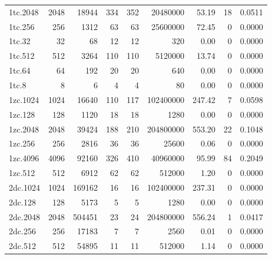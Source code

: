 {\begin{longtable}{lrrrrrrrr}
1tc.2048 & 2048 & 18944 & 334 & 352 & 20480000 & 53.19 & 18 & 0.0511 \\
1tc.256 & 256 & 1312 & 63 & 63 & 25600000 & 72.45 & 0 & 0.0000 \\
1tc.32 & 32 & 68 & 12 & 12 & 320 & 0.00 & 0 & 0.0000 \\
1tc.512 & 512 & 3264 & 110 & 110 & 5120000 & 13.74 & 0 & 0.0000 \\
1tc.64 & 64 & 192 & 20 & 20 & 640 & 0.00 & 0 & 0.0000 \\
1tc.8 & 8 & 6 & 4 & 4 & 80 & 0.00 & 0 & 0.0000 \\
1zc.1024 & 1024 & 16640 & 110 & 117 & 102400000 & 247.42 & 7 & 0.0598 \\
1zc.128 & 128 & 1120 & 18 & 18 & 1280 & 0.00 & 0 & 0.0000 \\
1zc.2048 & 2048 & 39424 & 188 & 210 & 204800000 & 553.20 & 22 & 0.1048 \\
1zc.256 & 256 & 2816 & 36 & 36 & 25600 & 0.06 & 0 & 0.0000 \\
1zc.4096 & 4096 & 92160 & 326 & 410 & 40960000 & 95.99 & 84 & 0.2049 \\
1zc.512 & 512 & 6912 & 62 & 62 & 512000 & 1.20 & 0 & 0.0000 \\
2dc.1024 & 1024 & 169162 & 16 & 16 & 102400000 & 237.31 & 0 & 0.0000 \\
2dc.128 & 128 & 5173 & 5 & 5 & 1280 & 0.00 & 0 & 0.0000 \\
2dc.2048 & 2048 & 504451 & 23 & 24 & 204800000 & 556.24 & 1 & 0.0417 \\
2dc.256 & 256 & 17183 & 7 & 7 & 2560 & 0.01 & 0 & 0.0000 \\
2dc.512 & 512 & 54895 & 11 & 11 & 512000 & 1.14 & 0 & 0.0000 \\
\end{longtable}}
